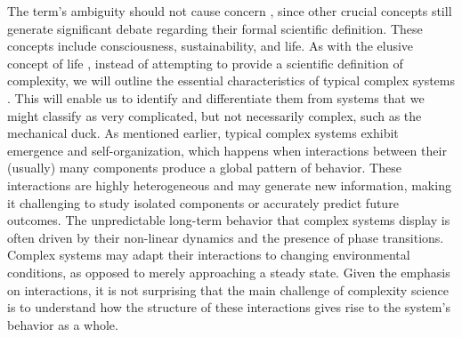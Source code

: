 The term's ambiguity should not cause concern \cite{horgan1995complexity}, since other crucial concepts still generate significant debate regarding their formal scientific definition. These concepts include consciousness, sustainability, and life. As with the elusive concept of life \cite{schrodinger1992life}, instead of attempting to provide a scientific definition of complexity, we will outline the essential characteristics of typical complex systems \cite{de2019complexity}. This will enable us to identify and differentiate them from systems that we might classify as very complicated, but not necessarily complex, such as the mechanical duck. As mentioned earlier, typical  complex systems exhibit emergence and self-organization, which happens when interactions between their (usually) many components produce a global pattern of behavior. These interactions are highly heterogeneous and may generate new information, making it challenging to study isolated components or accurately predict future outcomes. The unpredictable long-term behavior that complex systems display is often driven by their non-linear dynamics and the presence of phase transitions. Complex systems may adapt their interactions to changing environmental conditions, as opposed to merely approaching a steady state. Given the emphasis on interactions, it is not surprising that the main challenge of complexity science is to understand how the structure of these interactions gives rise to the system's behavior as a whole.\\

